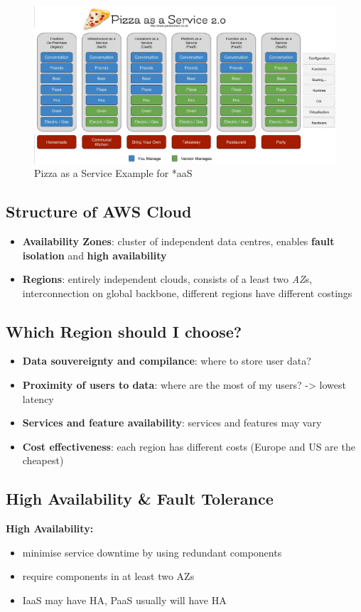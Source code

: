 \documentclass[a4paper]{article}
\begin{document}
\begin{multicols}{3}
\begin{figure}[H]
    \includegraphics[width=\linewidth]{pizzaserviceexample.png}
    \caption{Pizza as a Service Example for *aaS}
    \label{fig:pizzaservice}
\end{figure}

\subsection*{Structure of AWS Cloud}
\begin{itemize}
    \item \textbf{Availability Zones}: cluster of independent data centres, enables \textbf{fault isolation} and \textbf{high availability}
    \item \textbf{Regions}: entirely independent clouds, consists of a least two \textit{AZ}s, interconnection on global backbone,
    different regions have different costings
\end{itemize}

\subsection*{Which Region should I choose?}
\begin{itemize}
    \item \textbf{Data souvereignty and compilance}: where to store user data?
    \item \textbf{Proximity of users to data}: where are the most of my users? -> lowest latency
    \item \textbf{Services and feature availability}: services and features may vary
    \item \textbf{Cost effectiveness}: each region has different costs (Europe and US are the cheapest)
\end{itemize}

\subsection*{High Availability \& Fault Tolerance}
\textbf{High Availability:}
\begin{itemize}
    \item minimise service downtime by using redundant components
    \item require components in at least two AZs
    \item IaaS may have HA, PaaS usually will have HA
\end{itemize}


\end{multicols}
\end{document}
